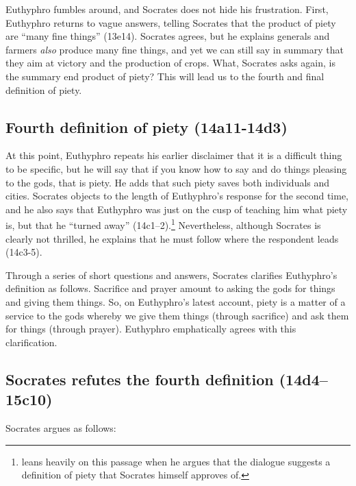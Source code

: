 \documentclass[11pt]{article}
\begin{document}
Euthyphro fumbles around, and Socrates does not hide his frustration.
First, Euthyphro returns to vague answers, telling Socrates that the
product of piety are ``many fine things'' (13e14).  Socrates agrees, but he
explains generals and farmers \emph{also} produce many fine things, and yet
we can still say in summary that they aim at victory and the production of
crops.  What, Socrates asks again, is the summary end product of piety?
This will lead us to the fourth and final definition of piety.


\subsection{Fourth definition of piety (14a11-14d3)}

At this point, Euthyphro repeats his earlier disclaimer that it is
a difficult thing to be specific, but he will say that if you know how to
say and do things pleasing to the gods, that is piety.  He adds that such
piety saves both individuals and cities.  Socrates objects to the length of
Euthyphro's response for the second time, and he also says that Euthyphro
was just on the cusp of teaching him what piety is, but that he ``turned
away'' (14c1--2).\footnote{\citet{mcpherran1992} leans heavily on this
passage when he argues that the dialogue suggests a definition of piety
that Socrates himself approves of.}  Nevertheless, although Socrates is
clearly not thrilled, he explains that he must follow where the respondent
leads (14c3-5).

Through a series of short questions and answers, Socrates clarifies
Euthyphro's definition as follows.  Sacrifice and prayer amount to asking
the gods for things and giving them things.  So, on Euthyphro's latest
account, piety is a matter of a service to the gods whereby we give them
things (through sacrifice) and ask them for things (through prayer).
Euthyphro emphatically agrees with this clarification.


\subsection{Socrates refutes the fourth definition (14d4--15c10)}

Socrates argues as follows:
\end{document}

